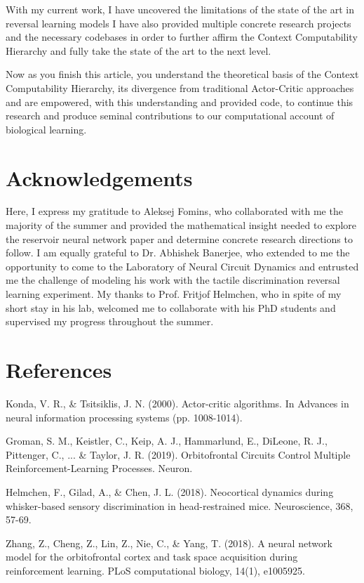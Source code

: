 \documentclass[]{article}
\begin{document}
With my current work, I have uncovered the limitations of the state of the art in reversal learning models  I have also provided multiple concrete research projects and the necessary codebases in order to further affirm the Context Computability Hierarchy and fully take the state of the art to the next level.

Now as you finish this article, you understand the theoretical basis of the Context Computability Hierarchy, its divergence from traditional Actor-Critic approaches and are empowered, with this understanding and provided code, to continue this research and produce seminal contributions to our computational account of biological learning.

\newpage
\section{Acknowledgements}

Here, I express my gratitude to Aleksej Fomins, who collaborated with me the majority of the summer and provided the mathematical insight needed to explore the reservoir neural network paper and determine concrete research directions to follow.  I am equally grateful to Dr. Abhishek Banerjee, who extended to me the opportunity to come to the Laboratory of Neural Circuit Dynamics and entrusted me the challenge of modeling his work with the tactile discrimination reversal learning experiment.  My thanks to Prof. Fritjof Helmchen, who in spite of my short stay in his lab, welcomed me to collaborate with his PhD students and supervised my progress throughout the summer.

\section{References}

Konda, V. R., \& Tsitsiklis, J. N. (2000). Actor-critic algorithms. In Advances in neural information processing systems (pp. 1008-1014).

Groman, S. M., Keistler, C., Keip, A. J., Hammarlund, E., DiLeone, R. J., Pittenger, C., ... \& Taylor, J. R. (2019). Orbitofrontal Circuits Control Multiple Reinforcement-Learning Processes. Neuron.

Helmchen, F., Gilad, A., \& Chen, J. L. (2018). Neocortical dynamics during whisker-based sensory discrimination in head-restrained mice. Neuroscience, 368, 57-69.

Zhang, Z., Cheng, Z., Lin, Z., Nie, C., \& Yang, T. (2018). A neural network model for the orbitofrontal cortex and task space acquisition during reinforcement learning. PLoS computational biology, 14(1), e1005925.
\end{document}
